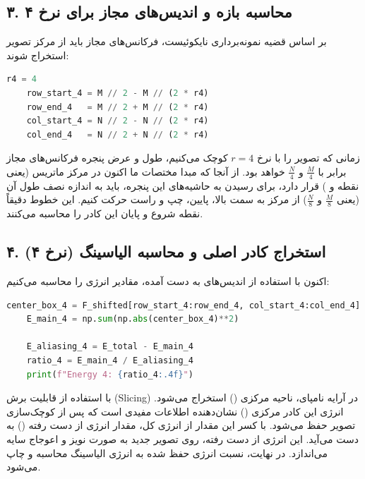 \newpage
\subsection*{۳. محاسبه بازه و اندیس‌های مجاز برای نرخ ۴}
بر اساس قضیه نمونه‌برداری نایکوئیست، فرکانس‌های مجاز باید از مرکز تصویر استخراج شوند:

\begin{codebox}
\begin{lstlisting}[language=Python]
    r4 = 4
    row_start_4 = M // 2 - M // (2 * r4)
    row_end_4   = M // 2 + M // (2 * r4)
    col_start_4 = N // 2 - N // (2 * r4)
    col_end_4   = N // 2 + N // (2 * r4)
\end{lstlisting}
\end{codebox}

زمانی که تصویر را با نرخ $r=4$ کوچک می‌کنیم، طول و عرض پنجره فرکانس‌های مجاز برابر با $\frac{M}{4}$ و $\frac{N}{4}$ خواهد بود. از آنجا که مبدا مختصات ما اکنون در مرکز ماتریس (یعنی نقطه  و ) قرار دارد، برای رسیدن به حاشیه‌های این پنجره، باید به اندازه نصف طول آن (یعنی $\frac{M}{8}$ و $\frac{N}{8}$) از مرکز به سمت بالا، پایین، چپ و راست حرکت کنیم. این خطوط دقیقاً نقطه شروع و پایان این کادر را محاسبه می‌کنند.

\subsection*{۴. استخراج کادر اصلی و محاسبه الیاسینگ (نرخ ۴)}
اکنون با استفاده از اندیس‌های به دست آمده، مقادیر انرژی را محاسبه می‌کنیم:

\begin{codebox}
\begin{lstlisting}[language=Python]
    center_box_4 = F_shifted[row_start_4:row_end_4, col_start_4:col_end_4]
    E_main_4 = np.sum(np.abs(center_box_4)**2)

    E_aliasing_4 = E_total - E_main_4
    ratio_4 = E_main_4 / E_aliasing_4
    print(f"Energy 4: {ratio_4:.4f}")
\end{lstlisting}
\end{codebox}

با استفاده از قابلیت برش (Slicing) در آرایه نامپای، ناحیه مرکزی () استخراج می‌شود. انرژی این کادر مرکزی () نشان‌دهنده اطلاعات مفیدی است که پس از کوچک‌سازی تصویر حفظ می‌شود. با کسر این مقدار از انرژی کل، مقدار انرژی از دست رفته () به دست می‌آید. این انرژی از دست رفته، روی تصویر جدید به صورت نویز و اعوجاج سایه می‌اندازد. در نهایت، نسبت انرژی حفظ شده به انرژی الیاسینگ محاسبه و چاپ می‌شود.

